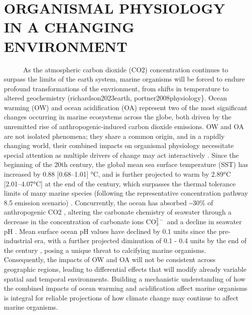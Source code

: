 \documentclass[
  12pt,
]{article}
\begin{document}
\hypertarget{organismal-physiology-in-a-changing-environment}{%
\section{ORGANISMAL PHYSIOLOGY IN A CHANGING
ENVIRONMENT}\label{organismal-physiology-in-a-changing-environment}}

~~~~~ As the atmospheric carbon dioxide (CO2) concentration continues to
surpass the limits of the earth system, marine organisms will be forced
to endure profound transformations of the envrionment, from shifts in
temperature to altered geochemistry (richardson2023earth,
portner2008physiology\}. Ocean warming (OW) and ocean acidification (OA)
represent two of the most significant changes occurring in marine
ecosystems across the globe, both driven by the unremitted rise of
anthropogenic-induced carbon dioxide emissions. OW and OA are not
isolated phenomena; they share a common origin, and in a rapidly
changing world, their combined impacts on organismal physiology
necessitate special attention as multiple drivers of change may act
interactively \cite{cote2016interactions}. Since the beginning of the
20th century, the global mean sea surface temperature (SST) has
increased by 0.88 {[}0.68--1.01{]} °C, and is further projected to warm
by 2.89°C {[}2.01--4.07°C{]} at the end of the century, which surpasses
the thermal tolerance limits of many marine species (following the
representative concentration pathway 8.5 emission scenario)
\cite{kikstra2022ipcc, fox2021ocean, bay2017genomic, somero2010physiology}.
Concurrently, the ocean has absorbed \textasciitilde30\% of
anthropogenic CO2 \cite{feely2004impact}, altering the carbonate
chemistry of seawater through a decrease in the concentration of
carbonate ions \(\mathrm{CO_3^{2-}}\) and a decline in seawater pH
\cite{feely2004impact}. Mean surface ocean pH values have declined by
0.1 units since the pre-industrial era, with a further projected
diminution of 0.1 - 0.4 units by the end of the century
\cite{change2014impacts, orr2005anthropogenic}, posing a unique threat
to calcifying marine organisms. Consequently, the impacts of OW and OA
will not be consistent across geographic regions, leading to
differential effects that will modify already variable spatial and
temporal environments. Building a mechanistic understanding of how the
combined impacts of ocean warming and acidification affect marine
organisms is integral for reliable projections of how climate change may
continue to affect marine organisms.
\end{document}
